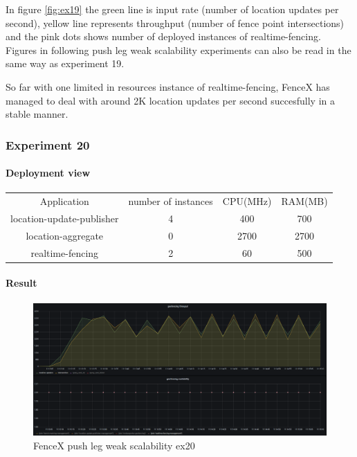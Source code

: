 \documentclass[a4]{report}
\begin{document}
        In figure \ref{fig:ex19} the green line is input rate (number of location updates per second),
        yellow line represents throughput (number of fence point intersections) and the pink dots shows number of
        deployed instances of realtime-fencing.
        Figures in following push leg weak scalability experiments can also be read in the same way as experiment 19.

        So far with one limited in resources instance of realtime-fencing, FenceX has managed to deal with around 2K
        location updates per second succesfully in a stable manner.

        \clearpage

        \subsubsection{Experiment 20}

        \paragraph{Deployment view}
        \begin{center}
            \begin{tabular}{ c c c c }
                Application               & number of instances & CPU(MHz) & RAM(MB) \\
                location-update-publisher & 4                   & 400      & 700     \\
                location-aggregate        & 0                   & 2700     & 2700    \\
                realtime-fencing          & 2                   & 60       & 500     \\
            \end{tabular}
        \end{center}

        \paragraph{Result}
        \begin{figure}[ht]
            \caption{FenceX push leg weak scalability ex20}
            \label{fig:ex20}
            \includegraphics[scale=0.4]{images/evaluation/ex20-benchmarking-ongoing-1per10sec.png}
        \end{figure}
\end{document}
